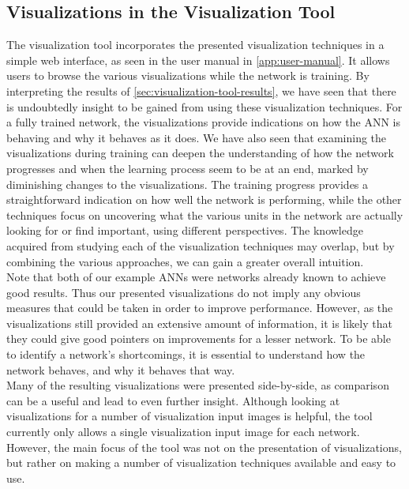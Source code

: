 \subsection{Visualizations in the Visualization Tool}

The visualization tool incorporates the presented visualization techniques in a simple web interface, as seen in the user manual in \autoref{app:user-manual}. It allows users to browse the various visualizations while the network is training. By interpreting the results of \autoref{sec:visualization-tool-results}, we have seen that there is undoubtedly insight to be gained from using these visualization techniques. For a fully trained network, the visualizations provide indications on how the ANN is behaving and why it behaves as it does. We have also seen that examining the visualizations during training can deepen the understanding of how the network progresses and when the learning process seem to be at an end, marked by diminishing changes to the visualizations. The training progress provides a straightforward indication on how well the network is performing, while the other techniques focus on uncovering what the various units in the network are actually looking for or find important, using different perspectives. The knowledge acquired from studying each of the visualization techniques may overlap, but by combining the various approaches, we can gain a greater overall intuition. \\

\noindent Note that both of our example ANNs were networks already known to achieve good results. Thus our presented visualizations do not imply any obvious measures that could be taken in order to improve performance. However, as the visualizations still provided an extensive amount of information, it is likely that they could give good pointers on improvements for a lesser network. To be able to identify a network's shortcomings, it is essential to understand how the network behaves, and why it behaves that way. \\

\noindent Many of the resulting visualizations were presented side-by-side, as comparison can be a useful and lead to even further insight. Although looking at visualizations for a number of visualization input images is helpful, the tool currently only allows a single visualization input image for each network. However, the main focus of the tool was not on the presentation of visualizations, but rather on making a number of visualization techniques available and easy to use. \\

